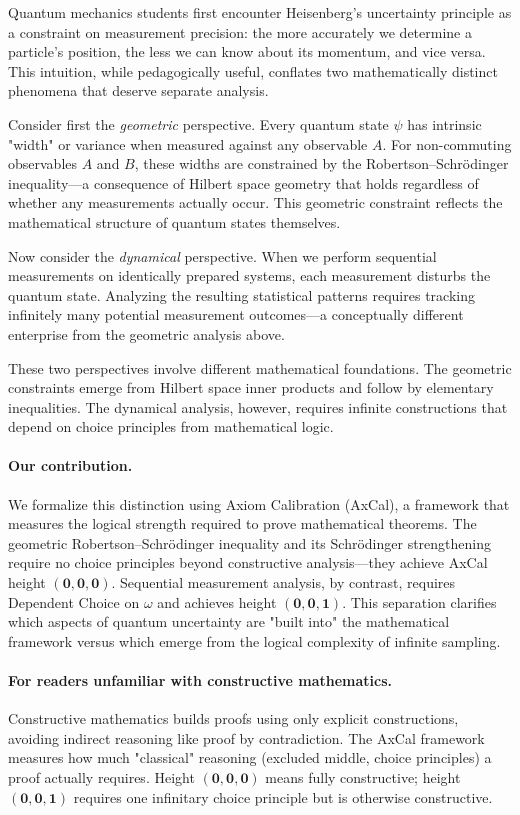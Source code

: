 \documentclass[11pt]{article}
\theoremstyle{plain}
\theoremstyle{definition}
\theoremstyle{remark}
\begin{document}
Quantum mechanics students first encounter Heisenberg's uncertainty principle as a constraint on measurement precision: the more accurately we determine a particle's position, the less we can know about its momentum, and vice versa. This intuition, while pedagogically useful, conflates two mathematically distinct phenomena that deserve separate analysis.

Consider first the \emph{geometric} perspective. Every quantum state $\psi$ has intrinsic "width" or variance when measured against any observable $A$. For non-commuting observables $A$ and $B$, these widths are constrained by the Robertson--Schrödinger inequality---a consequence of Hilbert space geometry that holds regardless of whether any measurements actually occur. This geometric constraint reflects the mathematical structure of quantum states themselves.

Now consider the \emph{dynamical} perspective. When we perform sequential measurements on identically prepared systems, each measurement disturbs the quantum state. Analyzing the resulting statistical patterns requires tracking infinitely many potential measurement outcomes---a conceptually different enterprise from the geometric analysis above.

These two perspectives involve different mathematical foundations. The geometric constraints emerge from Hilbert space inner products and follow by elementary inequalities. The dynamical analysis, however, requires infinite constructions that depend on choice principles from mathematical logic.

\paragraph{Our contribution.}
We formalize this distinction using Axiom Calibration (AxCal), a framework that measures the logical strength required to prove mathematical theorems. The geometric Robertson--Schrödinger inequality and its Schrödinger strengthening require no choice principles beyond constructive analysis---they achieve AxCal height $(\mathbf{0},\mathbf{0},\mathbf{0})$. Sequential measurement analysis, by contrast, requires Dependent Choice on $\omega$ and achieves height $(\mathbf{0},\mathbf{0},\mathbf{1})$. This separation clarifies which aspects of quantum uncertainty are "built into" the mathematical framework versus which emerge from the logical complexity of infinite sampling.

\paragraph{For readers unfamiliar with constructive mathematics.}
Constructive mathematics builds proofs using only explicit constructions, avoiding indirect reasoning like proof by contradiction. The AxCal framework measures how much "classical" reasoning (excluded middle, choice principles) a proof actually requires. Height $(\mathbf{0},\mathbf{0},\mathbf{0})$ means fully constructive; height $(\mathbf{0},\mathbf{0},\mathbf{1})$ requires one infinitary choice principle but is otherwise constructive.
\end{document}
